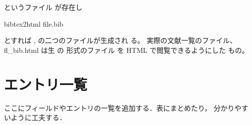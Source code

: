 というファイル  が存在し

 bibtex2html file.bib

とすれば ,  の二つのファイルが生成され
る。  実際の文献一覧のファイル、 fl{\_bib.html} は生
の \BibTeX 形式のファイル  を HTML で閲覧できるようにした
もの。

\section{\BibTeX エントリ一覧}


\begin{append}
 ここにフィールドやエントリの一覧を追加する．表にまとめたり，
分かりやすいように工夫する．
\end{append}

